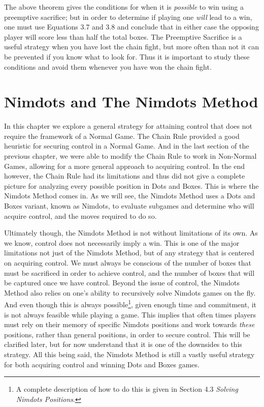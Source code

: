 \documentclass[12pt,twoside]{reedthesis}
\begin{document}
The above theorem gives the conditions for when it is \emph{possible} to win using a preemptive sacrifice; but in order to determine if playing one \emph{will} lead to a win, one must use Equations 3.7 and 3.8 and conclude that in either case the opposing player will score less than half the total boxes.  The Preemptive Sacrifice is a useful strategy when you have lost the chain fight, but more often than not it can be prevented if you know what to look for.  Thus it is important to study these conditions and avoid them whenever you have won the chain fight.



\chapter{Nimdots and The Nimdots Method}
In this chapter we explore a general strategy for attaining control that does not require the framework of a Normal Game.  The Chain Rule provided a good heuristic for securing control in a Normal Game.  And in the last section of the previous chapter, we were able to modify the Chain Rule to work in Non-Normal Games, allowing for a more general approach to acquiring control.  In the end however, the Chain Rule had its limitations and thus did not give a complete picture for analyzing every possible position in Dots and Boxes.  This is where the Nimdots Method comes in.  As we will see, the Nimdots Method uses a Dots and Boxes variant, known as Nimdots, to evaluate subgames and determine who will acquire control, and the moves required to do so.

Ultimately though, the Nimdots Method is not without limitations of its own.  As we know, control does not necessarily imply a win.  This is one of the major limitations not just of the Nimdots Method, but of any strategy that is centered on acquiring control.  We must always be conscious of the number of boxes that must be sacrificed in order to achieve control, and the number of boxes that will be captured once we have control.  Beyond the issue of control, the Nimdots Method also relies on one's ability to recursively solve Nimdots games on the fly.  And even though this is always possible\footnote[1]{A complete description of how to do this is given in Section 4.3 \emph{Solving Nimdots Positions}.}, given enough time and commitment, it is not always feasible while playing a game.  This implies that often times players must rely on their memory of specific Nimdots positions and work towards \emph{these} positions, rather than general positions, in order to secure control.  This will be clarified later, but for now understand that it is one of the downsides to this strategy.  All this being said, the Nimdots Method is still a vastly useful strategy for both acquiring control and winning Dots and Boxes games.
\end{document}
